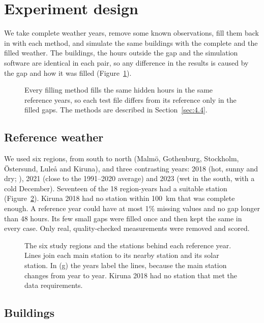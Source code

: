 \section{Experiment design}\label{sec:4}

We take complete weather years, remove some known observations, fill them back in with each method, and simulate the same buildings with the complete and the filled weather. The buildings, the hours outside the gap and the simulation software are identical in each pair, so any difference in the results is caused by the gap and how it was filled (Figure~\ref{fig:3}).

\begin{figure}[tbp]
\centering
{}
\caption{Every filling method fills the same hidden hours in the same reference years, so each test file differs from its reference only in the filled gaps. The methods are described in Section~\ref{sec:4.4}.}
\label{fig:3}
\end{figure}

\subsection{Reference weather}\label{sec:4.1}

We used six regions, from south to north (Malmö, Gothenburg, Stockholm, Östersund, Luleå and Kiruna), and three contrasting years: 2018 (hot, sunny and dry; \citealp{smhi2018}), 2021 (close to the 1991--2020 average) and 2023 (wet in the south, with a cold December). Seventeen of the 18 region-years had a suitable station (Figure~\ref{fig:4}). Kiruna 2018 had no station within 100~km that was complete enough. A reference year could have at most 1\% missing values and no gap longer than 48 hours. Its few small gaps were filled once and then kept the same in every case. Only real, quality-checked measurements were removed and scored.

\begin{figure}[tbp]
\centering
{}
\caption{The six study regions and the stations behind each reference year. Lines join each main station to its nearby station and its solar station. In (g) the years label the lines, because the main station changes from year to year. Kiruna 2018 had no station that met the data requirements.}
\label{fig:4}
\end{figure}

\subsection{Buildings}\label{sec:4.2}

